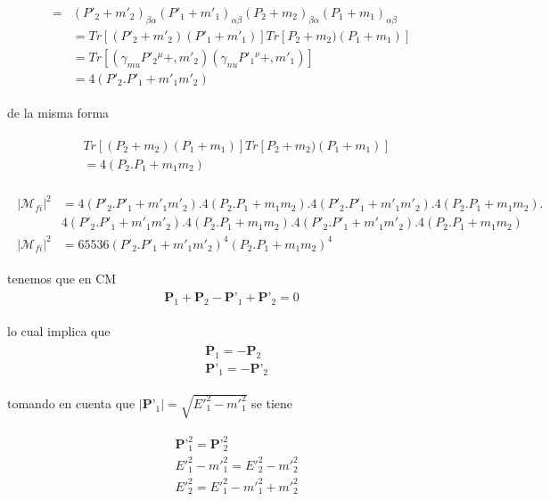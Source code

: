 \begin{gather}
\begin{split}
=&(P'_2+m'_2)_{\beta \alpha}(P'_1+m'_1)_{\alpha \beta}(P_2+m_2)_{\beta \alpha}(P_1+m_1)_{\alpha \beta}
\\&=Tr[(P'_2+m'_2)(P'_1+m'_1)]Tr[P_2+m_2)(P_1+m_1)]
\\&=Tr[(\gamma_{mu}P'_2{^\mu}+,m'_2)(\gamma_{nu}P'_1{^\nu}+,m'_1)]
\\&=4(P'_{2}.P'_{1}+m'_{1}m'{_2})
\end{split}
\end{gather}

de la misma forma

\begin{gather}
\begin{split}
&Tr[(P_2+m_2)(P_1+m_1)]Tr[P_2+m_2)(P_1+m_1)]
\\&=4(P_{2}.P_{1}+m_{1}m{_2})
\end{split}
\end{gather}

\begin{gather}
\begin{split}
{|\mathcal{M}_{fi}|}^2&=4({P'}_{2}.{P'}_{1}+{m'}_{1}{m'}_{2}).4(P_{2}.P_{1}+{m}_{1}m{_2}).4({P'}_{2}.{P'}_{1}+{m'}_{1}{m'}_{2}).4(P_{2}.P_{1}+m_{1}m{_2}).\\&4(P'_{2}.P'_{1}+m'_{1}m'{_2}).4(P_{2}.P_{1}+m_{1}m{_2}).4(P'_{2}.P'_{1}+m'_{1}m'{_2}).4(P_{2}.P_{1}+m_{1}m{_2})\\
{|\mathcal{M}_{fi}|}^2&=65536({P'}_{2}.{P'}_{1}+{m'}_{1}{m'}_{2})^{4}(P_{2}.P_{1}+{m}_{1}{m}_{2})^{4}
\end{split}
\end{gather}

tenemos que en CM
\begin{gather}
\begin{split}
\textbf{P}_1+\textbf{P}_2-\textbf{P'}_1+\textbf{P'}_2=0
\end{split}
\end{gather}

lo cual implica que
\begin{gather}
\begin{split}
&\textbf{P}_1=-\textbf{P}_2\\
&\textbf{P'}_1=-\textbf{P'}_2
\end{split}
\end{gather}

tomando en cuenta que $|\textbf{P'}_1|=\sqrt{{E'}_{1}^2-{m'}_{1}^2}$ se tiene

\begin{gather}
\begin{split}
&\textbf{P'}_1^2=\textbf{P'}_2^2\\
&{E'}_{1}^2-{m'}_{1}^2={E'}_{2}^2-{m'}_{2}^2\\
&{E'}_{2}^2={E'}_{1}^2-{m'}_{1}^2+{m'}_{2}^2
\end{split}
\end{gather}

